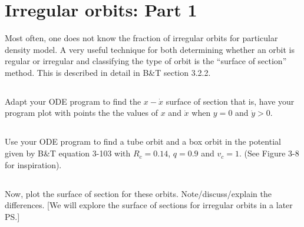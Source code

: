 \section{Irregular orbits: Part 1}
Most often, one does not know the fraction of irregular orbits for particular density model. A very useful technique for both determining whether an orbit is regular or irregular and classifying the type of orbit
is the “surface of section” method. This is described in detail in B\&T section 3.2.2.

\subsection{}
Adapt your ODE program to find the $x-\Dot{x}$ surface of section that
is, have your program plot with points the the values of $x$ and $\Dot{x}$
when $y = 0$ and $\Dot{y}> 0$.




\subsection{}
Use your ODE program to find a tube orbit and a box orbit in the
potential given by B\&T equation 3-103 with $R_c = 0.14$, $q = 0.9$
and $v_c = 1$. (See Figure 3-8 for inspiration).




\subsection{}
Now, plot the surface of section for these orbits. Note/discuss/explain
the differences. [We will explore the surface of sections for irregular orbits in a later PS.]

\clearpage